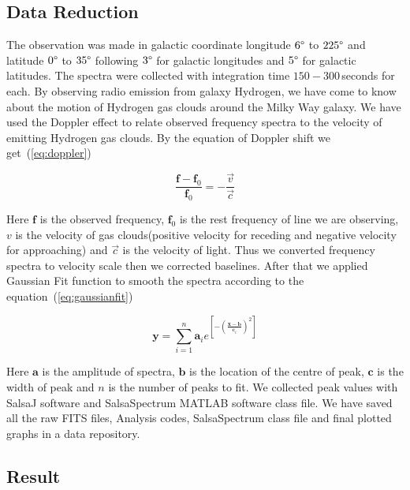 \documentclass[conference]{IEEEtran}
\begin{document}
\subsection{Data Reduction}

The observation was made in galactic coordinate longitude $6\degree$ to $225\degree$ and latitude $0\degree$ to $35\degree$ following $3\degree$ for galactic longitudes and $5\degree$ for galactic latitudes. The spectra were collected with integration time $150-300$\,seconds for each. By observing radio emission from galaxy Hydrogen, we have come to know about the motion of Hydrogen gas clouds around the Milky Way galaxy. We have used the Doppler effect to relate observed frequency spectra to the velocity of emitting Hydrogen gas clouds. By the equation of Doppler shift\cite{CathyHorellou2015} we get~(\ref{eq:doppler})

\begin{equation}
 \frac{\mathbf{f}-\mathbf{f}_{0}}{\mathbf{f}_{0}}=-\frac{\vec{v}}{\vec{c}}
 \label{eq:doppler}
\end{equation}

Here $\mathbf{f}$ is the observed frequency, $\mathbf{f}_{0}$ is the rest frequency of line we are observing, $\mathbf{\mathit{v}}$ is the velocity of gas clouds(positive velocity for receding and negative velocity for approaching) and $\vec{c}$ is the velocity of light. Thus we converted frequency spectra to velocity scale then we corrected baselines. After that we applied Gaussian Fit function to smooth the spectra according to the equation~(\ref{eq:gaussianfit})

\begin{equation}
  \mathbf{y}=\sum^n_{i=1}\mathbf{a}_{i}e^{\left[-\left(\frac{\mathbf{x}-\mathbf{b}}{\mathbf{c}_{i}} \right)^{2}\right]}
  \label{eq:gaussianfit}
\end{equation}

Here $\mathbf{a}$ is the amplitude of spectra, $\mathbf{b}$ is the location of the centre of peak, $\mathbf{c}$ is the width of peak and $n$ is the number of peaks to fit\cite{CathyHorellou2015}. We collected peak values with SalsaJ software and SalsaSpectrum\cite{DanielDahlin2015} MATLAB software class file. We have saved all the raw FITS files, Analysis codes, SalsaSpectrum class file and final plotted graphs in a data repository\cite{Hossain2018}.

\subsection{Result}
\end{document}
